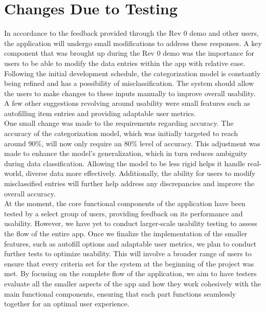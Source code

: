\documentclass[12pt, titlepage]{article}
\begin{document}
\newpage

\section{Changes Due to Testing}

In accordance to the feedback provided through the Rev 0 demo and other users, the application will undergo small modifications to address these responses. 
A key component that was brought up during the Rev 0 demo was the importance for users to be able to modify the data entries within the app with relative ease.
Following the initial development schedule, the categorization model is constantly being refined and has a possibility of misclassification. The system should 
allow the users to make changes to these inputs manually to improve overall usability. A few other suggestions revolving around usability were small features such as
autofilling item entries and providing adaptable user metrics.\\

One small change was made to the requirements regarding accuracy. The accuracy of the categorization model, which was initially targeted to reach around 90\%, 
will now only require an 80\% level of accuracy. This adjustment was made to enhance the model’s generalization, which in turn reduces ambiguity during data 
classification. Allowing the model to be less rigid helps it handle real-world, diverse data more effectively. Additionally, the ability for users to modify 
misclassified entries will further help address any discrepancies and improve the overall accuracy.\\

At the moment, the core functional components of the application have been tested by a select group of users, providing feedback on its performance and usability. 
However, we have yet to conduct larger-scale usability testing to assess the flow of the entire app. Once we finalize the implementation of the smaller 
 features, such as autofill options and adaptable user metrics, we plan to conduct further tests to optimize usability. This will involve a broader range of users to ensure 
 that every criteria set for the system at the beginning of the project was met. By focusing on the complete flow of the application, we aim
to have testers evaluate all the smaller aspects of the app and how they work cohesively with the main functional components, ensuring that each part functions 
seamlessly together for an optimal user experience.
\end{document}
